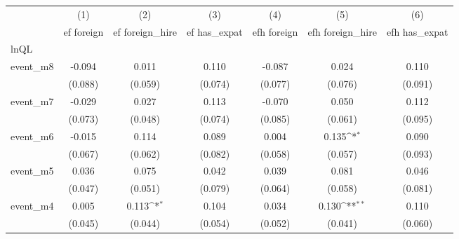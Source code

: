 {
\def\sym#1{\ifmmode^{#1}\else\(^{#1}\)\fi}
\begin{tabular}{l*{6}{c}}
\hline\hline
            &\multicolumn{1}{c}{(1)}&\multicolumn{1}{c}{(2)}&\multicolumn{1}{c}{(3)}&\multicolumn{1}{c}{(4)}&\multicolumn{1}{c}{(5)}&\multicolumn{1}{c}{(6)}\\
            &\multicolumn{1}{c}{ef foreign}&\multicolumn{1}{c}{ef foreign\_hire}&\multicolumn{1}{c}{ef has\_expat}&\multicolumn{1}{c}{efh foreign}&\multicolumn{1}{c}{efh foreign\_hire}&\multicolumn{1}{c}{efh has\_expat}\\
\hline
lnQL        &                     &                     &                     &                     &                     &                     \\
event\_m8    &      -0.094         &       0.011         &       0.110         &      -0.087         &       0.024         &       0.110         \\
            &     (0.088)         &     (0.059)         &     (0.074)         &     (0.077)         &     (0.076)         &     (0.091)         \\
[1em]
event\_m7    &      -0.029         &       0.027         &       0.113         &      -0.070         &       0.050         &       0.112         \\
            &     (0.073)         &     (0.048)         &     (0.074)         &     (0.085)         &     (0.061)         &     (0.095)         \\
[1em]
event\_m6    &      -0.015         &       0.114         &       0.089         &       0.004         &       0.135\sym{*}  &       0.090         \\
            &     (0.067)         &     (0.062)         &     (0.082)         &     (0.058)         &     (0.057)         &     (0.093)         \\
[1em]
event\_m5    &       0.036         &       0.075         &       0.042         &       0.039         &       0.081         &       0.046         \\
            &     (0.047)         &     (0.051)         &     (0.079)         &     (0.064)         &     (0.058)         &     (0.081)         \\
[1em]
event\_m4    &       0.005         &       0.113\sym{*}  &       0.104         &       0.034         &       0.130\sym{**} &       0.110         \\
            &     (0.045)         &     (0.044)         &     (0.054)         &     (0.052)         &     (0.041)         &     (0.060)         \\

\end{tabular}}
